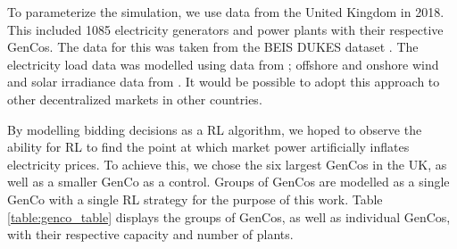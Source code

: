 To parameterize the simulation, we use data from the United Kingdom in 2018. This included 1085 electricity generators and power plants with their respective GenCos. The data for this was taken from the BEIS DUKES dataset \cite{dukes_511}. The electricity load data was modelled using data from \cite{gridwatch}; offshore and onshore wind and solar irradiance data from \cite{Pfenninger2016}. It would be possible to adopt this approach to other decentralized markets in other countries.

By modelling bidding decisions as a RL algorithm, we hoped to observe the ability for RL to find the point at which market power artificially inflates electricity prices. To achieve this, we chose the six largest GenCos in the UK, as well as a smaller GenCo as a control. Groups of GenCos are modelled as a single GenCo with a single RL strategy for the purpose of this work. Table \ref{table:genco_table} displays the groups of GenCos, as well as individual GenCos, with their respective capacity and number of plants.





